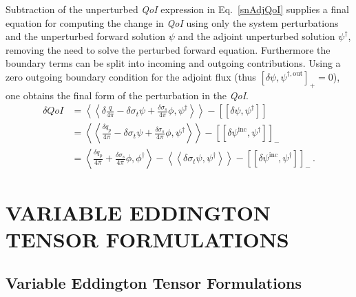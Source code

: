 \documentclass[12pt]{report}
\newcommand{\bra}{\left\langle}
\newcommand{\ket}{\right\rangle}
\newcommand{\braSN}{\left\langle \! \left\langle}
\newcommand{\ketSN}{\right\rangle \! \right\rangle}
\newcommand{\sbraSN}{\left[ \! \left[}
\newcommand{\sketSN}{\right] \! \right]}
\newcommand{\sbra}{\left[}
\newcommand{\sket}{\right]}
\newcommand{\sigt}{\sigma_t}
\newcommand{\sigs}{\sigma_s}
\newcommand{\angSource}{\frac{q}{4 \pi}}
\newcommand{\angSourced}{\frac{\delta q_p}{4 \pi}}
\newcommand{\qoi}{{\it QoI}\xspace}
\begin{document}
Subtraction of the unperturbed \qoi expression in Eq.~\eqref{snAdjQoI} supplies a final equation for computing the change in \qoi using only the system perturbations and the unperturbed forward solution $\psi$ and the adjoint unperturbed
solution $\psi^\dag$, removing the need to solve the perturbed forward equation. 
Furthermore the boundary terms can be split into incoming and outgoing contributions.
Using a zero outgoing boundary condition for the adjoint flux
(thus $\sbra \delta \psi, \psi^{\dag,\text{out}} \sket_+=0$), one obtains the final 
form of the perturbation in the \qoi.
\begin{equation}
\label{snSens}
\begin{split}
\delta QoI &= \braSN \delta \angSource - \delta \sigt \psi + \frac{\delta\sigs}{4 \pi} \phi  , \psi^\dag  \ketSN - \sbraSN \delta \psi, \psi^\dag \sketSN \\
&= \braSN \angSourced - \delta \sigt \psi + \frac{\delta\sigs}{4 \pi} \phi , \psi^\dag  \ketSN - \sbraSN \delta \psi^{\text{inc}}, \psi^\dag \sketSN_- \\
&= \bra \angSourced  + \frac{\delta\sigs}{4 \pi} \phi , \phi^\dag  \ket - \braSN  \delta \sigt \psi , \psi^\dag \ketSN - \sbraSN \delta \psi^{\text{inc}}, \psi^\dag \sketSN_- \,.
\end{split}
\end{equation}

\chapter{\uppercase {Variable Eddington Tensor Formulations}}
\section{Variable Eddington Tensor Formulations}
\end{document}
